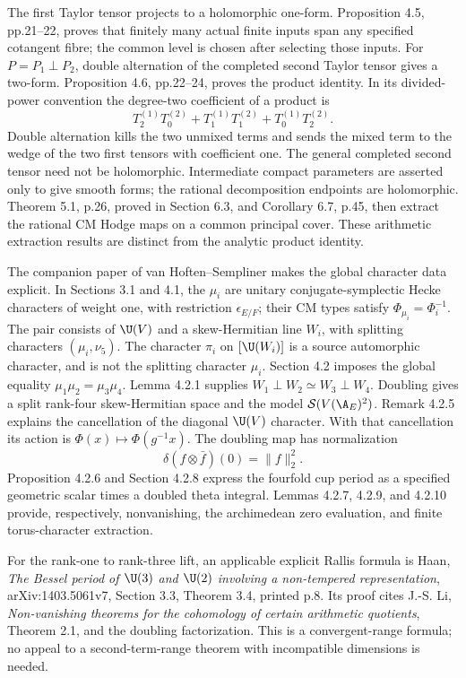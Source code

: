 \documentclass[11pt]{article}
\theoremstyle{definition}\newtheorem{definition}[theorem]{Definition}\newtheorem{remark}[theorem]{Remark}
\begin{document}
The first Taylor tensor projects to a holomorphic one-form. Proposition
4.5, pp.21--22, proves that finitely many actual finite inputs span any
specified cotangent fibre; the common level is chosen after selecting
those inputs. For $P=P_1\perp P_2$, double alternation of the completed
second Taylor tensor gives a two-form. Proposition 4.6, pp.22--24, proves
the product identity. In its divided-power convention the degree-two
coefficient of a product is
\[
 T_2^{(1)}T_0^{(2)}+T_1^{(1)}T_1^{(2)}+T_0^{(1)}T_2^{(2)}.
\]
Double alternation kills the two unmixed terms and sends the mixed term
to the wedge of the two first tensors with coefficient one. The general
completed second tensor need not be holomorphic. Intermediate compact
parameters are asserted only to give smooth forms; the rational
decomposition endpoints are holomorphic. Theorem 5.1, p.26, proved in
Section 6.3, and Corollary 6.7, p.45, then extract the rational CM Hodge
maps on a common principal cover. These arithmetic extraction results
are distinct from the analytic product identity.

The companion paper of van Hoften--Sempliner makes the global character
data explicit. In Sections 3.1 and 4.1, the $\mu_i$ are unitary
conjugate-symplectic Hecke characters of weight one, with restriction
$\epsilon_{E/F}$; their CM types satisfy
$\Phi_{\mu_i}=\Phi_i^{-1}$. The pair consists of $\U(V)$ and a
skew-Hermitian line $W_i$, with splitting characters $(\mu_i,\nu_5)$.
The character $\pi_i$ on $[\U(W_i)]$ is a source automorphic character,
and is not the splitting character $\mu_i$. Section 4.2 imposes the
global equality $\mu_1\mu_2=\mu_3\mu_4$. Lemma 4.2.1 supplies
$W_1\perp W_2\simeq W_3\perp W_4$. Doubling gives a split rank-four
skew-Hermitian space and the model $\mathcal S(V(\A_E)^2)$.
Remark 4.2.5 explains the cancellation of the diagonal $\U(V)$ character.
With that cancellation its action is $\Phi(x)\mapsto\Phi(g^{-1}x)$.
The doubling map has normalization
\[
 \delta(f\otimes\bar f)(0)=\|f\|_2^2.
\]
Proposition 4.2.6 and Section 4.2.8 express the fourfold cup period as a
specified geometric scalar times a doubled theta integral. Lemmas
4.2.7, 4.2.9, and 4.2.10 provide, respectively, nonvanishing, the
archimedean zero evaluation, and finite torus-character extraction.

For the rank-one to rank-three lift, an applicable explicit Rallis
formula is Haan, \emph{The Bessel period of $\U(3)$ and $\U(2)$ involving
a non-tempered representation}, arXiv:1403.5061v7, Section 3.3,
Theorem 3.4, printed p.8. Its proof cites J.-S. Li, \emph{Non-vanishing
theorems for the cohomology of certain arithmetic quotients}, Theorem
2.1, and the doubling factorization. This is a convergent-range
formula; no appeal to a second-term-range theorem with incompatible
dimensions is needed.
\end{document}
